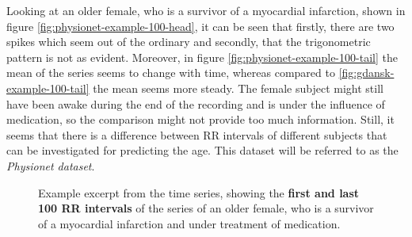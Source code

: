 \documentclass[11pt]{scrartcl}
\begin{document}
Looking at an older female, who is a survivor of a myocardial infarction, shown in figure \ref{fig:physionet-example-100-head}, it can be seen that firstly, there are two spikes which seem out of the ordinary and secondly, that the trigonometric pattern is not as evident. Moreover, in figure \ref{fig:physionet-example-100-tail} the mean of the series seems to change with time, whereas compared to \ref{fig:gdansk-example-100-tail} the mean seems more steady. The female subject might still have been awake during the end of the recording and is under the influence of medication, so the comparison might not provide too much information. Still, it seems that there is a difference between RR intervals of different subjects that can be investigated for predicting the age. This dataset will be referred to as the \textit{Physionet dataset}.

\begin{figure}[hbt]
	\caption{Example excerpt from the time series, showing the \textcolor{viridis5}{\textbf{first and last 100 RR intervals}} of the series of an older female, who is a survivor of a myocardial infarction and under treatment of medication.}
\end{figure}
\end{document}
